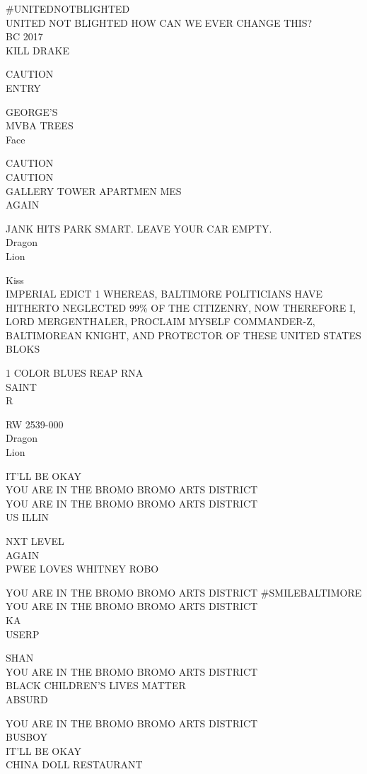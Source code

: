 \documentclass[10pt,letterpaper]{article}
\begin{document}
\#UNITEDNOTBLIGHTED\\
UNITED NOT BLIGHTED HOW CAN WE EVER CHANGE THIS?\\
BC 2017\\
KILL DRAKE

CAUTION\\
ENTRY

GEORGE'S\\
MVBA TREES\\
Face

CAUTION\\
CAUTION\\
GALLERY TOWER APARTMEN MES\\
AGAIN

JANK HITS PARK SMART. LEAVE YOUR CAR EMPTY.\\
Dragon\\
Lion

Kiss\\
IMPERIAL EDICT 1 WHEREAS, BALTIMORE POLITICIANS HAVE HITHERTO NEGLECTED 99\% OF THE CITIZENRY, NOW THEREFORE I, LORD MERGENTHALER, PROCLAIM MYSELF COMMANDER{-}Z, BALTIMOREAN KNIGHT, AND PROTECTOR OF THESE UNITED STATES\\
BLOKS

1 COLOR BLUES REAP RNA\\
SAINT\\
R

RW 2539{-}000\\
Dragon\\
Lion

IT'LL BE OKAY\\
YOU ARE IN THE BROMO BROMO ARTS DISTRICT\\
YOU ARE IN THE BROMO BROMO ARTS DISTRICT\\
US ILLIN

NXT LEVEL\\
AGAIN\\
PWEE LOVES WHITNEY ROBO

YOU ARE IN THE BROMO BROMO ARTS DISTRICT \#SMILEBALTIMORE\\
YOU ARE IN THE BROMO BROMO ARTS DISTRICT\\
KA\\
USERP

SHAN\\
YOU ARE IN THE BROMO BROMO ARTS DISTRICT\\
BLACK CHILDREN'S LIVES MATTER\\
ABSURD

YOU ARE IN THE BROMO BROMO ARTS DISTRICT\\
BUSBOY\\
IT'LL BE OKAY\\
CHINA DOLL RESTAURANT
\end{document}

